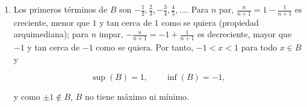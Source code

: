 \documentclass[
  spanish,
  a4paper,
]{scrreport}
\theoremstyle{definition}
\theoremstyle{remark}
\begin{document}
\begin{tcolorbox}[enhanced jigsaw, arc=.35mm, bottomrule=.15mm, bottomtitle=1mm, breakable, colback=white, colbacktitle=quarto-callout-tip-color!10!white, colframe=quarto-callout-tip-color-frame, coltitle=black, left=2mm, leftrule=.75mm, opacityback=0, opacitybacktitle=0.6, rightrule=.15mm, title=\textcolor{quarto-callout-tip-color}{\faLightbulb}\hspace{0.5em}{Solución}, titlerule=0mm, toprule=.15mm, toptitle=1mm]

\begin{enumerate}
\def\labelenumi{\alph{enumi}.}
\item
  Los primeros términos de \(B\) son
  \(-\frac{1}{2}, \frac{2}{3}, -\frac{3}{4}, \frac{4}{5}, \ldots\). Para
  \(n\) par, \(\frac{n}{n+1} = 1-\frac{1}{n+1}\) es creciente, menor que
  \(1\) y tan cerca de \(1\) como se quiera (propiedad arquimediana);
  para \(n\) impar, \(-\frac{n}{n+1} = -1+\frac{1}{n+1}\) es
  decreciente, mayor que \(-1\) y tan cerca de \(-1\) como se quiera.
  Por tanto, \(-1 < x < 1\) para todo \(x\in B\) y

  \[
  \sup(B) = 1, \qquad \inf(B) = -1,
  \]

  y como \(\pm 1\not\in B\), \(B\) no tiene máximo ni mínimo.


\end{enumerate}
\end{tcolorbox}
\end{document}
